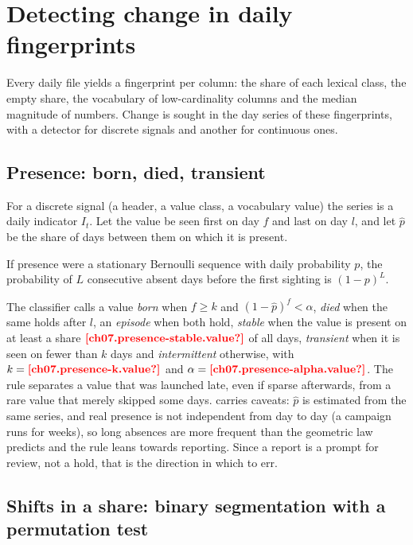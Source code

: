 \section{Detecting change in daily fingerprints}\label{sec:sf-detectors}

Every daily file yields a fingerprint per column: the share of each lexical class, the empty share, the vocabulary of
low-cardinality columns and the median magnitude of numbers. Change is sought in the day series of these
fingerprints, with a detector for discrete signals and another for continuous ones.

\subsection{Presence: born, died, transient}

For a discrete signal (a header, a value class, a vocabulary value) the series is a daily indicator $I_t$. Let the
value be seen first on day $f$ and last on day $l$, and let $\hat p$ be the share of days between them on which it is
present.

\begin{proposition}\label{prop:sf-presence}
If presence were a stationary Bernoulli sequence with daily probability $p$, the probability of $L$ consecutive absent
days before the first sighting is $(1 - p)^{L}$.
\end{proposition}

The classifier calls a value \emph{born} when $f \ge k$ and $(1-\hat p)^{f} < \alpha$, \emph{died} when the same holds
after $l$, an \emph{episode} when both hold, \emph{stable} when the value is present on at least a share
$\est{ch07.presence-stable}{value}$ of all days, \emph{transient} when it is seen on fewer than $k$ days and
\emph{intermittent} otherwise, with $k = \est{ch07.presence-k}{value}$ and $\alpha = \est{ch07.presence-alpha}{value}$.
The rule separates a value that was launched late, even if sparse afterwards, from a rare value that merely skipped some
days.  carries caveats: $\hat p$ is estimated from the same series, and real presence is not
independent from day to day (a campaign runs for weeks), so long absences are more frequent than the geometric law
predicts and the rule leans towards reporting. Since a report is a prompt for review, not a hold, that is the
direction in which to err.

\subsection{Shifts in a share: binary segmentation with a permutation test}

